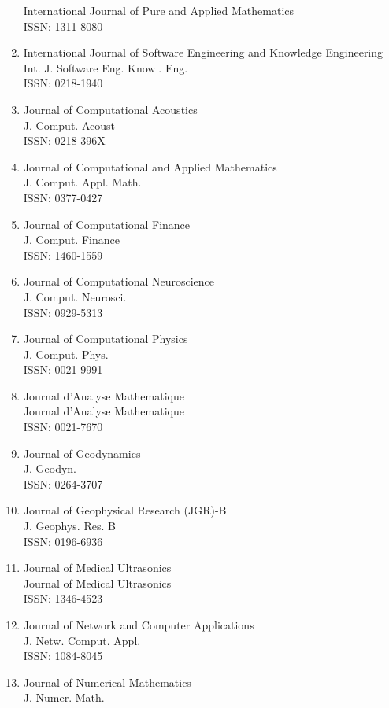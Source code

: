 \begin{enumerate}
 International Journal of Pure and Applied Mathematics\\
 ISSN: 1311-8080
\item
 International Journal of Software Engineering and Knowledge Engineering\\
 Int. J. Software Eng. Knowl. Eng.\\
 ISSN: 0218-1940
\item
 Journal of Computational Acoustics\\
 J. Comput. Acoust\\
 ISSN: 0218-396X
\item
 Journal of Computational and Applied Mathematics\\
 J. Comput. Appl. Math.\\
 ISSN: 0377-0427
\item
 Journal of Computational Finance\\
 J. Comput. Finance\\
 ISSN: 1460-1559
\item
 Journal of Computational Neuroscience\\
 J. Comput. Neurosci.\\
 ISSN: 0929-5313
\item
 Journal of Computational Physics\\
 J. Comput. Phys.\\
 ISSN: 0021-9991
\item
 Journal d'Analyse Mathematique\\
 Journal d'Analyse Mathematique\\
 ISSN: 0021-7670
\item
 Journal of Geodynamics\\
 J. Geodyn.\\
 ISSN: 0264-3707
\item
 Journal of Geophysical Research (JGR)-B\\
 J. Geophys. Res. B\\
 ISSN: 0196-6936
\item
 Journal of Medical Ultrasonics\\
 Journal of Medical Ultrasonics\\
 ISSN: 1346-4523
\item
 Journal of Network and Computer Applications\\
 J. Netw. Comput. Appl.\\
 ISSN: 1084-8045
\item
 Journal of Numerical Mathematics\\
 J. Numer. Math.\\

\end{enumerate}
